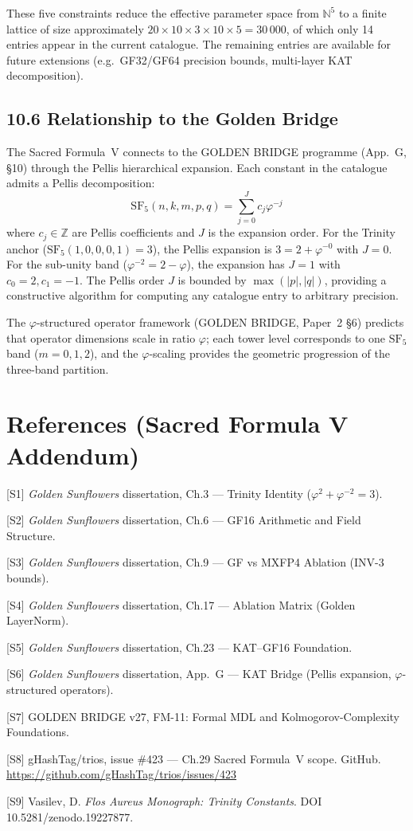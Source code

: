 These five constraints reduce the effective
parameter space from $\mathbb{N}^5$ to a finite
lattice of size approximately $20 \times 10 \times
3 \times 10 \times 5 = 30\,000$, of which only 14
entries appear in the current catalogue. The
remaining entries are available for future
extensions (e.g.\ GF32/GF64 precision bounds,
multi-layer KAT decomposition).

\subsection{10.6 Relationship to the Golden
Bridge}\label{fa_29:sf5-golden-bridge}

The Sacred Formula~V connects to the GOLDEN BRIDGE
programme (App.~G, \S10) through the Pellis
hierarchical expansion. Each constant in the
catalogue admits a Pellis decomposition:
\begin{equation}
\mathrm{SF}_5(n,k,m,p,q) =
\sum_{j=0}^{J} c_j \varphi^{-j}
\end{equation}
where $c_j \in \mathbb{Z}$ are Pellis coefficients
and $J$ is the expansion order. For the Trinity
anchor ($\mathrm{SF}_5(1,0,0,0,1) = 3$), the
Pellis expansion is $3 = 2 + \varphi^{-0}$ with
$J = 0$. For the sub-unity band ($\varphi^{-2} = 2
- \varphi$), the expansion has $J = 1$ with $c_0 =
2, c_1 = -1$. The Pellis order $J$ is bounded by
$\max(|p|, |q|)$, providing a constructive
algorithm for computing any catalogue entry to
arbitrary precision.

The $\varphi$-structured operator framework (GOLDEN
BRIDGE, Paper~2 \S6) predicts that operator
dimensions scale in ratio $\varphi$; each tower
level corresponds to one $\mathrm{SF}_5$ band ($m =
0, 1, 2$), and the $\varphi$-scaling provides the
geometric progression of the three-band partition.

\section{References (Sacred Formula V
Addendum)}\label{fa_29:references-sf5}

[S1] \emph{Golden Sunflowers} dissertation,
Ch.3 --- Trinity Identity
($\varphi^2 + \varphi^{-2} = 3$).

[S2] \emph{Golden Sunflowers} dissertation,
Ch.6 --- GF16 Arithmetic and Field Structure.

[S3] \emph{Golden Sunflowers} dissertation,
Ch.9 --- GF vs MXFP4 Ablation (INV-3 bounds).

[S4] \emph{Golden Sunflowers} dissertation,
Ch.17 --- Ablation Matrix (Golden LayerNorm).

[S5] \emph{Golden Sunflowers} dissertation,
Ch.23 --- KAT--GF16 Foundation.

[S6] \emph{Golden Sunflowers} dissertation,
App.~G --- KAT Bridge (Pellis expansion,
$\varphi$-structured operators).

[S7] GOLDEN BRIDGE v27, FM-11: Formal MDL and
Kolmogorov-Complexity Foundations.

[S8] gHashTag/trios, issue \#423 --- Ch.29 Sacred
Formula~V scope. GitHub.
\url{https://github.com/gHashTag/trios/issues/423}

[S9] Vasilev, D. \emph{Flos Aureus Monograph:
Trinity Constants}. DOI
10.5281/zenodo.19227877.

